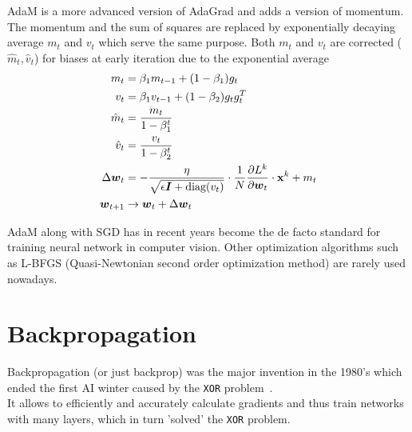 AdaM is a more advanced version of AdaGrad and adds a version of momentum.
The momentum and the sum of squares are replaced by exponentially decaying average $m_t$ and $v_t$ which serve the same purpose.
Both $m_t$ and $v_t$ are corrected ($\hat{m}_t, \hat{v}_t$) for biases at early iteration due to the exponential average
\begin{align}
    m_t & = \beta_1 m_{t-1} + (1 - \beta_1) g_t \\
    v_t & = \beta_1 v_{t-1} + (1 - \beta_2) g_t g_t^T \\
    \hat{m}_t & = \frac{m_t}{1 - \beta_1^t} \\
    \hat{v}_t & = \frac{v_t}{1 - \beta_2^t} \\
    \Delta \boldsymbol{w}_t & = - \frac{\eta}{\sqrt{\epsilon \boldsymbol{I} + \text{diag}(v_t)}} \cdot \frac{1}{N} \frac{\partial L^k}{\partial \boldsymbol{w}_t} \cdot \mathbf{x}^k + m_t \\
    \boldsymbol{w}_{t+1} & \rightarrow \boldsymbol{w}_t + \Delta \boldsymbol{w}_t
\end{align}

AdaM along with SGD has in recent years become the de facto standard for training neural network in computer vision.
Other optimization algorithms such as L-BFGS (Quasi-Newtonian second order optimization method) are rarely used nowadays.




\section{Backpropagation}
Backpropagation (or just backprop) was the major invention in the 1980's which ended the first AI winter caused by the \lstinline|XOR| problem~\cite{ommer}. \\
It allows to efficiently and accurately calculate gradients and thus train networks with many layers, which in turn 'solved' the \lstinline|XOR| problem.

